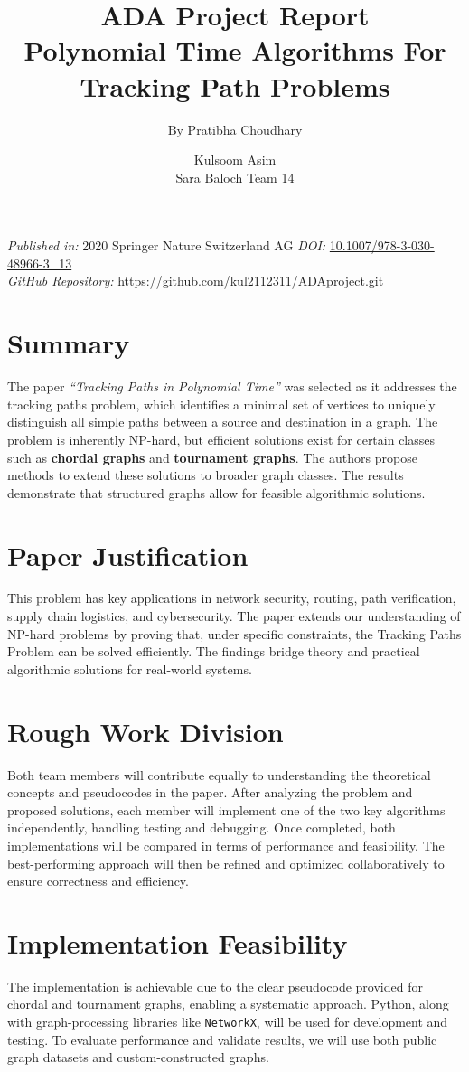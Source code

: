\documentclass[a4paper,12pt]{article}
\title{\textbf{ADA Project Report} \\ \large Polynomial Time Algorithms For Tracking Path Problems}
\author{By Pratibha Choudhary}
\author{Kulsoom Asim \\ Sara Baloch Team 14}
\date{}
\begin{document}
\maketitle
\noindent \textit{Published in:} 2020 Springer Nature Switzerland AG \newline
\textit{DOI:} \href{https://doi.org/10.1007/978-3-030-48966-3_13}{10.1007/978-3-030-48966-3\_13} \\
\textit{GitHub Repository:} \href{https://github.com/kul2112311/ADAproject.git}{https://github.com/kul2112311/ADAproject.git}

\section*{Summary}
The paper \textit{“Tracking Paths in Polynomial Time”} was selected as it addresses the tracking paths problem, which identifies a minimal set of vertices to uniquely distinguish all simple paths between a source and destination in a graph. The problem is inherently NP-hard, but efficient solutions exist for certain classes such as \textbf{chordal graphs} and \textbf{tournament graphs}. The authors propose methods to extend these solutions to broader graph classes. The results demonstrate that structured graphs allow for feasible algorithmic solutions.

\section*{Paper Justification}
This problem has key applications in network security, routing, path verification, supply chain logistics, and cybersecurity. The paper extends our understanding of NP-hard problems by proving that, under specific constraints, the Tracking Paths Problem can be solved efficiently. The findings bridge theory and practical algorithmic solutions for real-world systems.

\section*{Rough Work Division}
Both team members will contribute equally to understanding the theoretical concepts and pseudocodes in the paper. After analyzing the problem and proposed solutions, each member will implement one of the two key algorithms independently, handling testing and debugging. Once completed, both implementations will be compared in terms of performance and feasibility. The best-performing approach will then be refined and optimized collaboratively to ensure correctness and efficiency.

\section*{Implementation Feasibility}
The implementation is achievable due to the clear pseudocode provided for chordal and tournament graphs, enabling a systematic approach. Python, along with graph-processing libraries like \texttt{NetworkX}, will be used for development and testing. To evaluate performance and validate results, we will use both public graph datasets and custom-constructed graphs.
\end{document}
